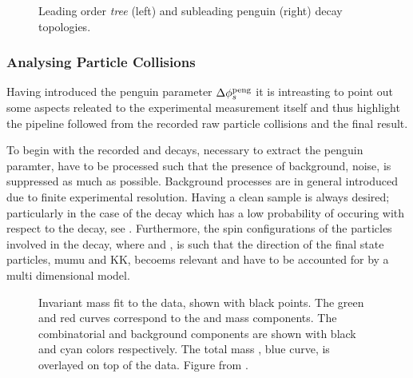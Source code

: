 \begin{figure}[t]
  \begin{subfigure}{0.5\textwidth}
    \raggedright
    {\scalebox{1}{\sffamily }}
    \label{app_jpsiphi_tree}
  \end{subfigure}%
  \hfill
  \begin{subfigure}{0.5\textwidth}
    \raggedleft
    {\scalebox{1}{\sffamily }}
    \label{app_jpsiphi_peng}
  \end{subfigure}
    \caption{Leading order {\it tree} (left) and subleading penguin (right) \BsJpsiPhi decay topologies.}
  \label{app_jpsiphi_tree_peng}
\end{figure}

\subsubsection{Analysing Particle Collisions}
Having introduced the penguin parameter $\Delta\phi_{s}^{\tiny\text{peng}}$ it is intreasting to point out some
aspects releated to the experimental measurement itself and thus highlight the pipeline followed from
the recorded raw particle collisions and the final result.

To begin with the recorded \BsJpsiKst and \BsJpsiRho decays, necessary to extract the penguin paramter,
have to be processed such that the presence of background, noise, is suppressed as much as possible.
Background processes are in general introduced due to finite experimental resolution. Having a clean
sample is always desired; particularly in the case of the \BsJpsiKst decay which has a low probability
of occuring with respect to the \BdJpsiKst decay, see . Furthermore, the spin
configurations of the particles involved in the \BsJpsiPhi decay, where \Jpsimumu and \phiKK, is such
that the direction of the final state particles, mumu and KK, becoems relevant and have to be accounted
for by a multi dimensional model.

\begin{figure}[t]
  \centering
  \scalebox{0.5}{}
  \caption{Invariant mass fit to the data, shown with black points. The green and red curves correspond to the \BdJpsiKst and
           \BsJpsiKst mass \pdf components. The combinatorial and \LbJpsippi background components are shown with black and cyan
           colors respectively. The total mass \pdf, blue curve, is overlayed on top of the data. Figure from \cite{bsjpsikst-paper}. }
  \label{app_mass_plot}
\end{figure}


